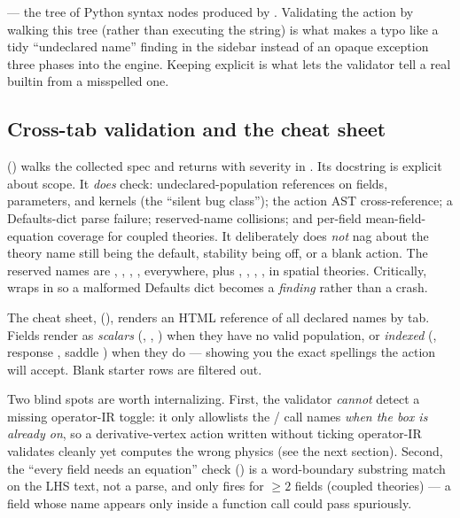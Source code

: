 \begin{defn}
 --- the tree of Python syntax nodes produced by
. Validating the action by walking this tree (rather than
executing the string) is what makes a typo like  a tidy
``undeclared name'' finding in the sidebar instead of an opaque exception three
phases into the engine. Keeping  explicit is what lets the
validator tell a real builtin from a misspelled one.
\end{defn}

\subsection{Cross-tab validation and the cheat sheet}

 () walks the collected spec
and returns  with severity
in . Its docstring is explicit about scope. It
\emph{does} check: undeclared-population references on fields, parameters, and
kernels (the ``silent  bug class''); the action AST
cross-reference; a Defaults-dict parse failure; reserved-name collisions; and
per-field mean-field-equation coverage for coupled theories. It deliberately does
\emph{not} nag about the theory name still being the default, stability being off,
or a blank action. The reserved names are , , ,
,  everywhere, plus , ,
, ,  in spatial theories. Critically, 
wraps  in  so a malformed Defaults dict becomes
a \emph{finding} rather than a crash.

The cheat sheet,  (),
renders an HTML reference of all declared names by tab. Fields render as
\emph{scalars} (, , ) when they have no valid
population, or \emph{indexed} (, response ,
saddle ) when they do --- showing you the exact spellings the action
will accept. Blank starter rows are filtered out.

\begin{gotcha}
Two blind spots are worth internalizing. First, the validator \emph{cannot} detect
a missing operator-IR toggle: it only allowlists the / call
names \emph{when the box is already on}, so a derivative-vertex action written
without ticking operator-IR validates cleanly yet computes the wrong physics (see
the next section). Second, the ``every field needs an equation'' check
() is a word-boundary substring match on the LHS
text, not a parse, and only fires for $\ge 2$ fields (coupled theories) --- a field
whose name appears only inside a function call could pass spuriously.
\end{gotcha}

